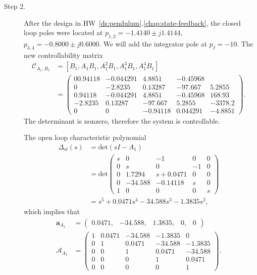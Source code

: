 \begin{description}
\item[Step 2.] 
After the design in HW~\ref{ds:pendulum}.\ref{chap:state-feedback}, the closed loop poles were located at $p_{1,2} = -1.4140 \pm j1.4144$, $p_{3,4}=  -0.8000 \pm j 0.6000$.
We will add the integrator pole at $p_I=-10$.
The new controllability matrix
\begin{align*}
\mathcal{C}_{A_1,B_1} &= [B_1, A_1B_1, A_1^2B_1, A_1^3B_1, A_1^4B_1] \\
&= \begin{pmatrix} 
         0     0.94118 & -0.044291 &   4.8851 & -0.45968 \\
        0 &   -2.8235 &   0.13287 &  -97.667 &   5.2855 \\
    0.94118 & -0.044291 &    4.8851 & -0.45968 &   168.93 \\
   -2.8235 &   0.13287 &   -97.667 &   5.2855 &  -3378.2 \\
        0 &         0 &  -0.94118 & 0.044291 &  -4.8851
         \end{pmatrix}.
\end{align*}
The determinant is nonzero, therefore the system is controllable.  

The open loop characteristic polynomial
\begin{align*}
\Delta_{ol}(s)&=\text{det}(sI-A_1) \\
 &= \text{det} \begin{pmatrix} 
        s &        0 &   -1 &        0  &       0 \\
 		0 &        s &        0 &   -1  &       0 \\ 
 		0 &  1.7294 &  s+0.0471 &        0  &       0 \\
 		0 &  -34.588 &   -0.14118 &        s  &       0 \\
 		1 &        0 &        0 &        0  &       s
	\end{pmatrix} \\
&= s^5 + 0.0471s^4 -34.588s^3 - 1.3835s^2,
\end{align*}
which implies that
\begin{align*}
\mathbf{a}_{A_1} &= \begin{pmatrix}0.0471, & -34.588, & 1.3835,  &      0,  &       0\end{pmatrix} \\
\mathcal{A}_{A_1} &= \begin{pmatrix} 
1 & 0.0471 & -34.588 &   -1.3835 & 0 \\ 
0 & 1 & 0.0471 & -34.588 &   -1.3835 \\ 
0 & 0 & 1 & 0.0471 & -34.588 \\
0 & 0 & 0 & 1 & 0.0471 \\
0 & 0 & 0 & 0 & 1
\end{pmatrix}.
\end{align*}


\end{description}
